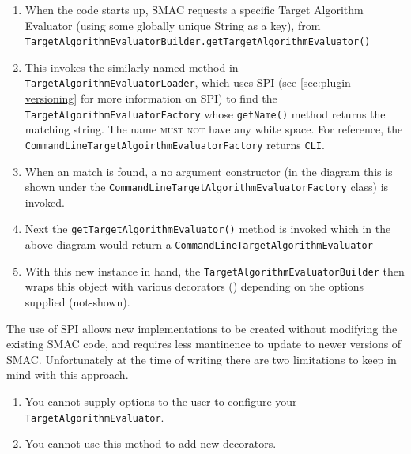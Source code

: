 \documentclass[manual.tex]{subfiles}
\begin{document}
\begin{enumerate}

\item When the code starts up, SMAC requests a specific Target Algorithm Evaluator (using some globally unique String as a key), from \texttt{TargetAlgorithmEvaluatorBuilder.getTargetAlgorithmEvaluator()} 

\item This invokes the similarly named method in \texttt{TargetAlgorithmEvaluatorLoader}, which uses SPI (see \ref{sec:plugin-versioning} for more information on SPI) to find the \texttt{TargetAlgorithmEvaluatorFactory} whose \texttt{getName()} method returns the matching string. The name \textsc{must not}  have any white space. For reference, the \\ \texttt{CommandLineTargetAlgoirthmEvaluatorFactory} returns \texttt{CLI}.

\item When an match is found, a no argument constructor (in the diagram this is shown under the \texttt{CommandLineTargetAlgorithmEvaluatorFactory} class) is invoked. 

\item Next the \texttt{getTargetAlgorithmEvaluator()} method is invoked which in the above diagram would return a \texttt{CommandLineTargetAlgorithmEvaluator}

\item With this new instance in hand, the \texttt{TargetAlgorithmEvaluatorBuilder} then wraps this object with various decorators () depending on the options supplied (not-shown).

\end{enumerate}

The use of SPI allows new implementations to be created without modifying the existing SMAC code, and requires less mantinence to update to newer versions of SMAC. Unfortunately at the time of writing there are two limitations to keep in mind with this approach.

\begin{enumerate}

\item You cannot supply options to the user to configure your \texttt{TargetAlgorithmEvaluator}.

\item You cannot use this method to add new decorators. 

\end{enumerate}
\end{document}
